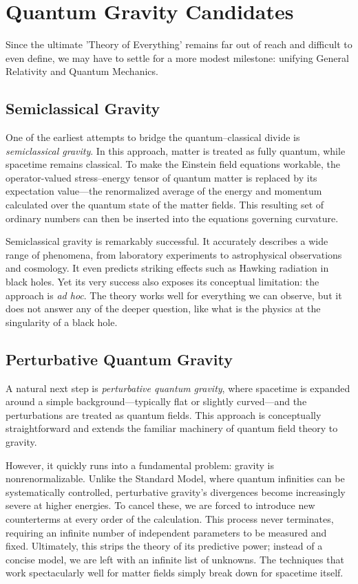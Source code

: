 \chapter{Quantum Gravity Candidates}
\label{chap:quantum-gravity-candidates}

Since the ultimate 'Theory of Everything' remains far out of reach and difficult to even define, we may have to settle for a more modest milestone: unifying General Relativity and Quantum Mechanics.

\section{Semiclassical Gravity}

One of the earliest attempts to bridge the quantum--classical divide is \emph{semiclassical gravity}. In this approach, matter is treated as fully quantum, while spacetime remains classical. To make the Einstein field equations workable, the operator-valued stress--energy tensor of quantum matter is replaced by its expectation value—the renormalized average of the energy and momentum calculated over the quantum state of the matter fields. This resulting set of ordinary numbers can then be inserted into the equations governing curvature.

Semiclassical gravity is remarkably successful. It accurately describes a wide range of phenomena, from laboratory experiments to astrophysical observations and cosmology. It even predicts striking effects such as Hawking radiation in black holes. Yet its very success also exposes its conceptual limitation: the approach is \emph{ad hoc}.
The theory works well for everything we can observe, but it does not answer any of the deeper question, like what is the physics at the singularity of a black hole.

\section{Perturbative Quantum Gravity}

A natural next step is \emph{perturbative quantum gravity}, where spacetime is expanded around a simple background—typically flat or slightly curved—and the perturbations are treated as quantum fields. This approach is conceptually straightforward and extends the familiar machinery of quantum field theory to gravity.

However, it quickly runs into a fundamental problem: gravity is nonrenormalizable. Unlike the Standard Model, where quantum infinities can be systematically controlled, perturbative gravity's divergences become increasingly severe at higher energies. To cancel these, we are forced to introduce new counterterms at every order of the calculation. This process never terminates, requiring an infinite number of independent parameters to be measured and fixed. Ultimately, this strips the theory of its predictive power; instead of a concise model, we are left with an infinite list of unknowns. The techniques that work spectacularly well for matter fields simply break down for spacetime itself.

